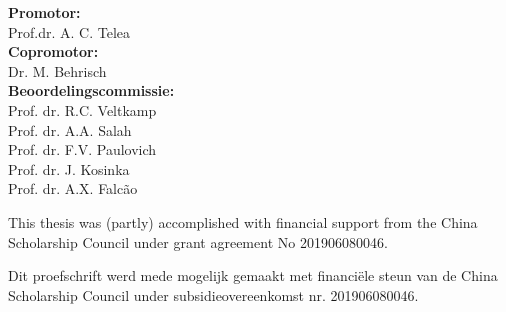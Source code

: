 \thispagestyle{empty}

\begin{addmargin}[-2cm]{0.2cm}


\Large \textbf{Promotor:}\\ 
\Large Prof.dr. A. C. Telea\\[1em]
\Large \textbf{Copromotor:}\\ 
\Large Dr. M. Behrisch\\[1em]
\Large \textbf{Beoordelingscommissie:}\\ 
\Large Prof. dr. R.C. Veltkamp\\ 
\Large Prof. dr. A.A. Salah\\ 
\Large Prof. dr. F.V. Paulovich\\ 
\Large Prof. dr. J. Kosinka\\ 
\Large Prof. dr. A.X. Falcão\\[2.5em] 



\renewcommand{\baselinestretch}{1.2} 

{\flushleft\large

This thesis was (partly) accomplished with financial support from the China Scholarship Council under grant agreement No 201906080046. \par
}

{\flushleft\large

Dit proefschrift werd mede mogelijk gemaakt met financi\"ele steun van de China Scholarship Council under subsidieovereenkomst nr. 201906080046. \par
}\par

\renewcommand{\baselinestretch}{1.0} 

\end{addmargin} 